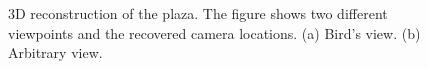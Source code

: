 \begin{figure}
    \centerline{
    }
    \caption{3D reconstruction of the plaza. The figure shows two different viewpoints and the recovered camera locations. (a) Bird's view.  (b) Arbitrary view.}
    \label{fig:sfm:3dpalma}
\end{figure}






